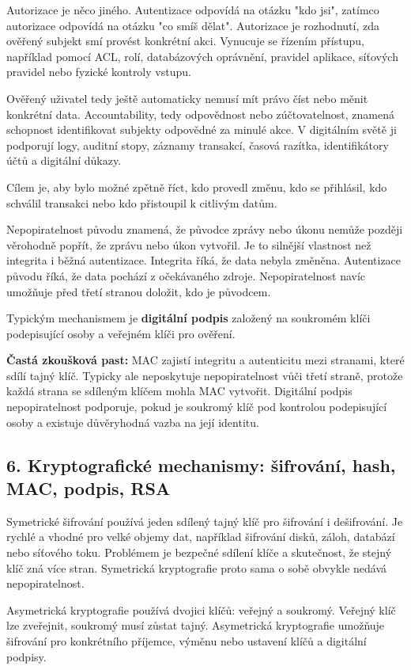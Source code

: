 \documentclass[11pt,a4paper]{article}
\newcommand{\itzk}[1]{\medskip\noindent\colorbox{blue!7}{\parbox{\dimexpr\linewidth-2\fboxsep}{#1}}\medskip}
\begin{document}
Autorizace je něco jiného. Autentizace odpovídá na otázku "kdo jsi", zatímco autorizace odpovídá na otázku "co smíš dělat". Autorizace je rozhodnutí, zda ověřený subjekt smí provést konkrétní akci. Vynucuje se řízením přístupu, například pomocí ACL, rolí, databázových oprávnění, pravidel aplikace, síťových pravidel nebo fyzické kontroly vstupu.

Ověřený uživatel tedy ještě automaticky nemusí mít právo číst nebo měnit konkrétní data. Accountability, tedy odpovědnost nebo zúčtovatelnost, znamená schopnost identifikovat subjekty odpovědné za minulé akce. V digitálním světě ji podporují logy, auditní stopy, záznamy transakcí, časová razítka, identifikátory účtů a digitální důkazy.

Cílem je, aby bylo možné zpětně říct, kdo provedl změnu, kdo se přihlásil, kdo schválil transakci nebo kdo přistoupil k citlivým datům.

Nepopiratelnost původu znamená, že původce zprávy nebo úkonu nemůže později věrohodně popřít, že zprávu nebo úkon vytvořil. Je to silnější vlastnost než integrita i běžná autentizace. Integrita říká, že data nebyla změněna. Autentizace původu říká, že data pochází z očekávaného zdroje. Nepopiratelnost navíc umožňuje před třetí stranou doložit, kdo je původcem.

Typickým mechanismem je \textbf{digitální podpis} založený na soukromém klíči podepisující osoby a veřejném klíči pro ověření.

\itzk{\textbf{Častá zkoušková past:} MAC zajistí integritu a autenticitu mezi stranami, které sdílí tajný klíč. Typicky ale neposkytuje nepopiratelnost vůči třetí straně, protože každá strana se sdíleným klíčem mohla MAC vytvořit. Digitální podpis nepopiratelnost podporuje, pokud je soukromý klíč pod kontrolou podepisující osoby a existuje důvěryhodná vazba na její identitu.}

\subsection*{6. Kryptografické mechanismy: šifrování, hash, MAC, podpis, RSA}

Symetrické šifrování používá jeden sdílený tajný klíč pro šifrování i dešifrování. Je rychlé a vhodné pro velké objemy dat, například šifrování disků, záloh, databází nebo síťového toku. Problémem je bezpečné sdílení klíče a skutečnost, že stejný klíč zná více stran. Symetrická kryptografie proto sama o sobě obvykle nedává nepopiratelnost.

Asymetrická kryptografie používá dvojici klíčů: veřejný a soukromý. Veřejný klíč lze zveřejnit, soukromý musí zůstat tajný. Asymetrická kryptografie umožňuje šifrování pro konkrétního příjemce, výměnu nebo ustavení klíčů a digitální podpisy.
\end{document}
